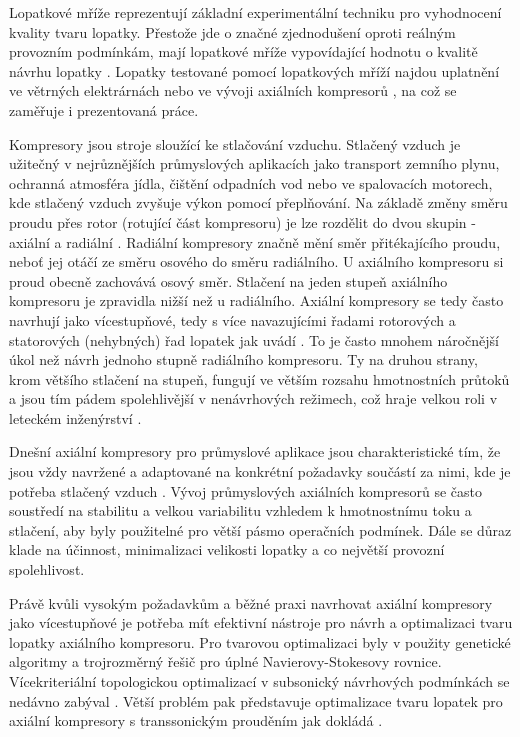 Lopatkové mříže reprezentují základní experimentální techniku pro vyhodnocení kvality tvaru lopatky. 
Přestože jde o značné zjednodušení oproti reálným provozním podmínkám, mají lopatkové mříže vypovídající hodnotu o kvalitě návrhu lopatky \cite{steinert1990design}. 
Lopatky testované pomocí lopatkových mříží najdou uplatnění ve větrných elektrárnách \cite{jafari2018aerodynamic} nebo ve vývoji axiálních kompresorů \cite{hobbs1983development}, na což se zaměřuje i prezentovaná práce.

Kompresory jsou stroje sloužící ke stlačování vzduchu. Stlačený vzduch je užitečný v nejrůznějších průmyslových aplikacích jako transport zemního plynu, ochranná atmosféra jídla, čištění odpadních vod \cite{dalbert1999radial} nebo ve spalovacích motorech, kde stlačený vzduch zvyšuje výkon pomocí přeplňování. 
Na základě změny směru proudu přes rotor (rotující část kompresoru) je lze rozdělit do dvou skupin - axiální a radiální \cite{cumpsty1989compressor}. 
Radiální kompresory značně mění směr přitékajícího proudu, neboť jej otáčí ze směru osového do směru radiálního. 
U axiálního kompresoru si proud obecně zachovává osový směr. 
Stlačení na jeden stupeň axiálního kompresoru je zpravidla nižší než u radiálního. 
Axiální kompresory se tedy často navrhují jako vícestupňové, tedy s více navazujícími řadami rotorových a statorových (nehybných) řad lopatek jak uvádí \cite{Farokhi2014_propulsion}. 
To je často mnohem náročnější úkol než návrh jednoho stupně radiálního kompresoru. 
Ty na druhou strany, krom většího stlačení na stupeň, fungují ve větším rozsahu hmotnostních průtoků \cite{Xu_2006} a jsou tím pádem spolehlivější v nenávrhových režimech, což hraje velkou roli v leteckém inženýrství \cite{kovavr2021searching}.

Dnešní axiální kompresory pro průmyslové aplikace jsou charakteristické tím, že jsou vždy navržené a adaptované na konkrétní požadavky součástí za nimi, kde je potřeba stlačený vzduch \cite{steinert1990design}. 
Vývoj průmyslových axiálních kompresorů se často soustředí na stabilitu a velkou variabilitu vzhledem k hmotnostnímu toku a stlačení, aby byly použitelné pro větší pásmo operačních podmínek. 
Dále se důraz klade na účinnost, minimalizaci velikosti lopatky a co největší provozní spolehlivost. 

Právě kvůli vysokým požadavkům a běžné praxi navrhovat axiální kompresory jako vícestupňové je potřeba mít efektivní nástroje pro návrh a optimalizaci tvaru lopatky axiálního kompresoru. 
Pro tvarovou optimalizaci byly v \cite{lotfi2006shape} použity genetické algoritmy a trojrozměrný řešič pro úplné Navierovy-Stokesovy rovnice.
Vícekriteriální topologickou optimalizací v subsonický návrhových podmínkách se nedávno zabýval \cite{blinov2019multi}. 
Větší problém pak představuje optimalizace tvaru lopatek pro axiální kompresory s transsonickým prouděním jak dokládá \cite{song2014blade}. 

